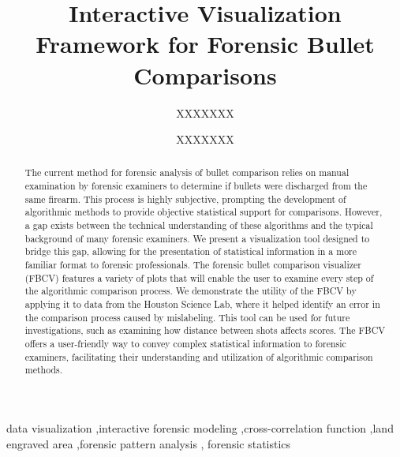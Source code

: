 \documentclass[
  number,
  preprint,
  5p,
  twocolumn]{elsarticle}
\begin{document}
\begin{frontmatter}
\title{Interactive Visualization Framework for Forensic Bullet
Comparisons}
\author[1]{XXXXXXX%
%
}
\author[1]{XXXXXXX%
%
}




        
\begin{abstract}
The current method for forensic analysis of bullet comparison relies on
manual examination by forensic examiners to determine if bullets were
discharged from the same firearm. This process is highly subjective,
prompting the development of algorithmic methods to provide objective
statistical support for comparisons. However, a gap exists between the
technical understanding of these algorithms and the typical background
of many forensic examiners. We present a visualization tool designed to
bridge this gap, allowing for the presentation of statistical
information in a more familiar format to forensic professionals. The
forensic bullet comparison visualizer (FBCV) features a variety of plots
that will enable the user to examine every step of the algorithmic
comparison process. We demonstrate the utility of the FBCV by applying
it to data from the Houston Science Lab, where it helped identify an
error in the comparison process caused by mislabeling. This tool can be
used for future investigations, such as examining how distance between
shots affects scores. The FBCV offers a user-friendly way to convey
complex statistical information to forensic examiners, facilitating
their understanding and utilization of algorithmic comparison methods.
\end{abstract}





\begin{keyword}
    data visualization \sep interactive forensic
modeling \sep cross-correlation function \sep land engraved
area \sep forensic pattern analysis \sep 
    forensic statistics
\end{keyword}
\end{frontmatter}
    

\clearpage
\newpage

\setcounter{page}{1}
\pagestyle{fancy}
\fancyhead{} 
\fancyfoot{} 
\fancyfoot[R]{\thepage}
\end{document}
